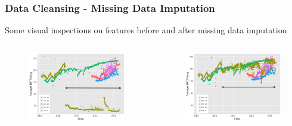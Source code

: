 \documentclass[xcolor=table]{beamer}
\begin{document}
\begin{frame}
\frametitle{Data Cleansing - Missing Data Imputation}
\begin{block}{}
Some visual inspections on features before and after missing data imputation
\end{block}

\begin{columns}[c]
\begin{figure}
\includegraphics[width=1\linewidth,left]{adpt_t.png} 
\end{figure}

\begin{figure}
\includegraphics[width=1\linewidth, right]{pre_adpt_t.png}
\end{figure}
\end{columns}

\end{frame}
\end{document}

